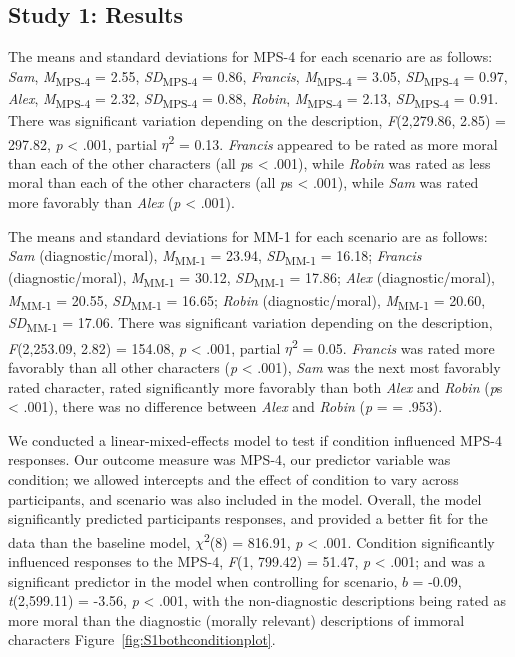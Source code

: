 \documentclass[
  american,
  man,floatsintext]{apa7}
\begin{document}
\hypertarget{study-1-results}{%
\subsection{Study 1: Results}\label{study-1-results}}

The means and standard deviations for MPS-4 for each scenario are as follows:
\emph{Sam},
\emph{M}\textsubscript{MPS-4} = 2.55, \emph{SD}\textsubscript{MPS-4} = 0.86,
\emph{Francis},
\emph{M}\textsubscript{MPS-4} = 3.05, \emph{SD}\textsubscript{MPS-4} = 0.97,
\emph{Alex},
\emph{M}\textsubscript{MPS-4} = 2.32, \emph{SD}\textsubscript{MPS-4} = 0.88,
\emph{Robin},
\emph{M}\textsubscript{MPS-4} = 2.13, \emph{SD}\textsubscript{MPS-4} = 0.91. There was significant variation depending on the description, \emph{F}(2,279.86, 2.85) = 297.82, \emph{p} \textless{} .001, partial \(\eta\)\textsuperscript{2} = 0.13. \emph{Francis} appeared to be rated as more moral than each of the other characters (all \emph{p}s \textless{} .001), while \emph{Robin} was rated as less moral than each of the other characters (all \emph{p}s \textless{} .001), while \emph{Sam} was rated more favorably than \emph{Alex} (\emph{p} \textless{} .001).

The means and standard deviations for MM-1 for each scenario are as follows:
\emph{Sam} (diagnostic/moral),
\emph{M}\textsubscript{MM-1} = 23.94, \emph{SD}\textsubscript{MM-1} = 16.18;
\emph{Francis} (diagnostic/moral),
\emph{M}\textsubscript{MM-1} = 30.12, \emph{SD}\textsubscript{MM-1} = 17.86;
\emph{Alex} (diagnostic/moral),
\emph{M}\textsubscript{MM-1} = 20.55, \emph{SD}\textsubscript{MM-1} = 16.65;
\emph{Robin} (diagnostic/moral),
\emph{M}\textsubscript{MM-1} = 20.60, \emph{SD}\textsubscript{MM-1} = 17.06. There was significant variation depending on the description, \emph{F}(2,253.09, 2.82) = 154.08, \emph{p} \textless{} .001, partial \(\eta\)\textsuperscript{2} = 0.05. \emph{Francis} was rated more favorably than all other characters (\emph{p} \textless{} .001), \emph{Sam} was the next most favorably rated character, rated significantly more favorably than both \emph{Alex} and \emph{Robin} (\emph{p}s \textless{} .001), there was no difference between \emph{Alex} and \emph{Robin} (\emph{p} = = .953).

We conducted a linear-mixed-effects model to test if condition influenced MPS-4 responses. Our outcome measure was MPS-4, our predictor variable was condition; we allowed intercepts and the effect of condition to vary across participants, and scenario was also included in the model.
Overall, the model significantly predicted participants responses, and provided a better fit for the data than the baseline model, \(\chi\)\textsuperscript{2}(8) = 816.91, \emph{p} \textless{} .001. Condition significantly influenced responses to the MPS-4, \emph{F}(1, 799.42) = 51.47, \emph{p} \textless{} .001; and was a significant predictor in the model when controlling for scenario, \(b\) = -0.09, \emph{t}(2,599.11) = -3.56, \emph{p} \textless{} .001, with the non-diagnostic descriptions being rated as more moral than the diagnostic (morally relevant) descriptions of immoral characters Figure~\ref{fig:S1bothconditionplot}.
\end{document}
